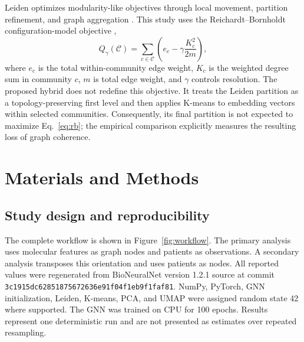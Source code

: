 \documentclass[11pt]{article}
\begin{document}
Leiden optimizes modularity-like objectives through local movement, partition refinement, and graph aggregation \cite{traag2019}. This study uses the Reichardt--Bornholdt configuration-model objective \cite{reichardt2006},
\begin{equation}
Q_{\gamma}(\mathcal{C}) = \sum_{c\in\mathcal{C}}
\left(e_c - \gamma\frac{K_c^2}{2m}\right),
\label{eq:rb}
\end{equation}
where $e_c$ is the total within-community edge weight, $K_c$ is the weighted degree sum in community $c$, $m$ is total edge weight, and $\gamma$ controls resolution. The proposed hybrid does not redefine this objective. It treats the Leiden partition as a topology-preserving first level and then applies K-means to embedding vectors within selected communities. Consequently, its final partition is not expected to maximize Eq.~\ref{eq:rb}; the empirical comparison explicitly measures the resulting loss of graph coherence.

\section{Materials and Methods}

\subsection{Study design and reproducibility}

The complete workflow is shown in Figure~\ref{fig:workflow}. The primary analysis uses molecular features as graph nodes and patients as observations. A secondary analysis transposes this orientation and uses patients as nodes. All reported values were regenerated from BioNeuralNet version 1.2.1 source at commit \texttt{3c1915dc62851875672636e91f04f1eb9f1faf81}. NumPy, PyTorch, GNN initialization, Leiden, K-means, PCA, and UMAP were assigned random state 42 where supported. The GNN was trained on CPU for 100 epochs. Results represent one deterministic run and are not presented as estimates over repeated resampling.
\end{document}
